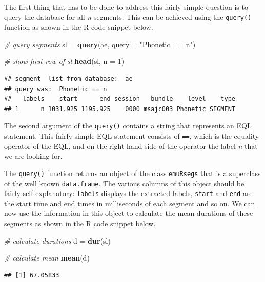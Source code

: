 \documentclass[]{book}
\newenvironment{Shaded}{\begin{snugshade}}{\end{snugshade}}
\newcommand{\CommentTok}[1]{\textcolor[rgb]{0.56,0.35,0.01}{\textit{#1}}}
\newcommand{\DataTypeTok}[1]{\textcolor[rgb]{0.13,0.29,0.53}{#1}}
\newcommand{\DecValTok}[1]{\textcolor[rgb]{0.00,0.00,0.81}{#1}}
\newcommand{\KeywordTok}[1]{\textcolor[rgb]{0.13,0.29,0.53}{\textbf{#1}}}
\newcommand{\NormalTok}[1]{#1}
\newcommand{\StringTok}[1]{\textcolor[rgb]{0.31,0.60,0.02}{#1}}
\begin{document}
The first thing that has to be done to address this fairly simple question is to query the database for all \emph{n} segments. This can be achieved using the \texttt{query()} function as shown in the R code snippet below.

\begin{Shaded}
\begin{Highlighting}[]
\CommentTok{# query segments}
\NormalTok{sl =}\StringTok{ }\KeywordTok{query}\NormalTok{(ae, }\DataTypeTok{query =} \StringTok{"Phonetic == n"}\NormalTok{)}

\CommentTok{# show first row of sl}
\KeywordTok{head}\NormalTok{(sl, }\DataTypeTok{n =} \DecValTok{1}\NormalTok{)}
\end{Highlighting}
\end{Shaded}

\begin{verbatim}
## segment  list from database:  ae 
## query was:  Phonetic == n 
##   labels    start      end session   bundle    level    type
## 1      n 1031.925 1195.925    0000 msajc003 Phonetic SEGMENT
\end{verbatim}

The second argument of the \texttt{query()} contains a string that represents an EQL statement. This fairly simple EQL statement consists of \texttt{==}, which is the equality operator of the EQL, and on the right hand side of the operator the label \emph{n} that we are looking for.

The \texttt{query()} function returns an object of the class \texttt{emuRsegs} that is a superclass of the well known \texttt{data.frame}. The various columns of this object should be fairly self-explanatory: \texttt{labels} displays the extracted labels, \texttt{start} and \texttt{end} are the start time and end times in milliseconds of each segment and so on. We can now use the information in this object to calculate the mean durations of these segments as shown in the R code snippet below.

\begin{Shaded}
\begin{Highlighting}[]
\CommentTok{# calculate durations}
\NormalTok{d =}\StringTok{ }\KeywordTok{dur}\NormalTok{(sl)}

\CommentTok{# calculate mean}
\KeywordTok{mean}\NormalTok{(d)}
\end{Highlighting}
\end{Shaded}

\begin{verbatim}
## [1] 67.05833
\end{verbatim}
\end{document}
